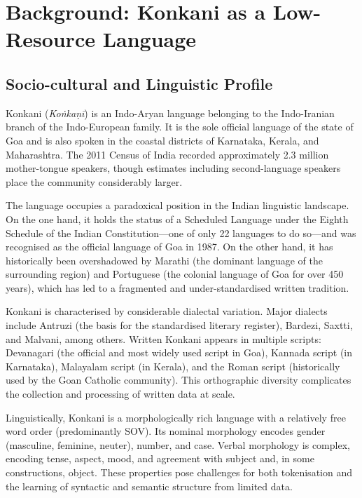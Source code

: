 \section{Background: Konkani as a Low-Resource Language}
\label{sec:background}

\subsection{Socio-cultural and Linguistic Profile}

Konkani (\textit{Koṅkaṇī}) is an Indo-Aryan language belonging to the Indo-Iranian branch of the Indo-European family. It is the sole official language of the state of Goa and is also spoken in the coastal districts of Karnataka, Kerala, and Maharashtra. The 2011 Census of India recorded approximately 2.3 million mother-tongue speakers, though estimates including second-language speakers place the community considerably larger.

The language occupies a paradoxical position in the Indian linguistic landscape. On the one hand, it holds the status of a Scheduled Language under the Eighth Schedule of the Indian Constitution—one of only 22 languages to do so—and was recognised as the official language of Goa in 1987. On the other hand, it has historically been overshadowed by Marathi (the dominant language of the surrounding region) and Portuguese (the colonial language of Goa for over 450 years), which has led to a fragmented and under-standardised written tradition.

Konkani is characterised by considerable dialectal variation. Major dialects include Antruzi (the basis for the standardised literary register), Bardezi, Saxtti, and Malvani, among others. Written Konkani appears in multiple scripts: Devanagari (the official and most widely used script in Goa), Kannada script (in Karnataka), Malayalam script (in Kerala), and the Roman script (historically used by the Goan Catholic community). This orthographic diversity complicates the collection and processing of written data at scale.

Linguistically, Konkani is a morphologically rich language with a relatively free word order (predominantly SOV). Its nominal morphology encodes gender (masculine, feminine, neuter), number, and case. Verbal morphology is complex, encoding tense, aspect, mood, and agreement with subject and, in some constructions, object. These properties pose challenges for both tokenisation and the learning of syntactic and semantic structure from limited data.

